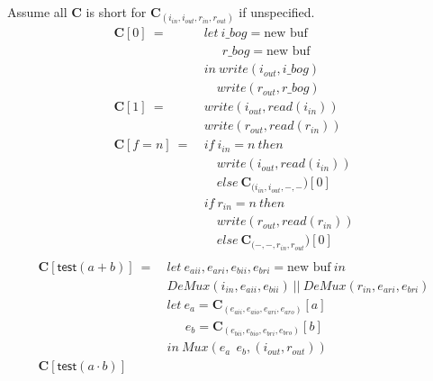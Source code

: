 \documentclass[12pt, letterpaper]{article}
\begin{document}
    Assume all $\mathbf{C}$ is short for $\mathbf{C}_{(i_{in},i_{out},r_{in},r_{out})}$ if unspecified.
    {\fontsize{12pt}{14pt}\selectfont
    \begin{align*}
      \mathbf{C}[0]\ 
        =\ &
        let\ i\_bog = \text{new buf}\\
        &\quad\ \ r\_bog = \text{new buf}\\
        &in\ write(i_{out}, i\_bog)\\
        &\quad  write(r_{out}, r\_bog)\\
      \mathbf{C}[1]\ 
        =\ &
        write(i_{out}, read(i_{in}))\\
        &write(r_{out}, read(r_{in}))
        \\
      \mathbf{C}[f = n]\
         =\
         &if\ i_{in}=n\ then\\
         &\quad write(i_{out}, read(i_{in}))\\
         &\quad else\ \mathbf{C}_{(i_{in}, i_{out}, -, -})[0]\\
         &if\ r_{in}=n\ then\\
         &\quad write(r_{out}, read(r_{in}))\\
         &\quad else\ \mathbf{C}_{(-, -, r_{in}, r_{out}})[0]\\
    \end{align*}
    \begin{align*}
      \mathbf{C}[\mathsf{test}(a + b)]\ 
        =\ &
        let\ e_{aii}, e_{ari}, e_{bii}, e_{bri} = \text{new buf}\ in\\
           &DeMux(i_{in}, e_{aii}, e_{bii})\ ||\ DeMux(r_{in}, e_{ari}, e_{bri})\\
        &let\ e_a = \mathbf{C}_{(e_{aii},e_{aio},e_{ari},e_{aro})}[a]\\
        &\quad\ \ e_b = \mathbf{C}_{(e_{bii},e_{bio},e_{bri},e_{bro})}[b]\\
        &in\ Mux(e_a\ \ e_b, (i_{out},r_{out}))\\
      \mathbf{C}[\mathsf{test}(a \cdot b)]\ 

\end{align*}}
\end{document}
